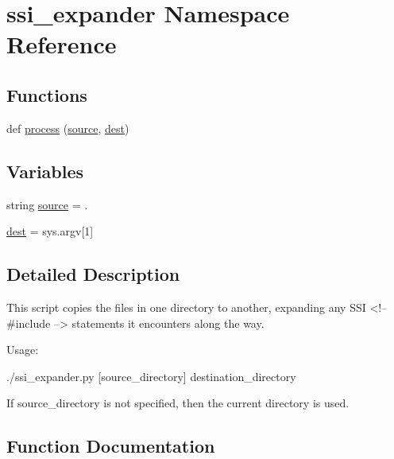 \hypertarget{namespacessi__expander}{}\section{ssi\+\_\+expander Namespace Reference}
\label{namespacessi__expander}
\subsection*{Functions}
\begin{DoxyCompactItemize}
\item 
def \hyperlink{namespacessi__expander_a7e24c8507483ff63310e4e1118ad66bb}{process} (\hyperlink{namespacessi__expander_ae8fa20efba305e039de78680ea6b3fdb}{source}, \hyperlink{namespacessi__expander_ac2e87b5a0738e3d26bda34f001011cc4}{dest})
\end{DoxyCompactItemize}
\subsection*{Variables}
\begin{DoxyCompactItemize}
\item 
string \hyperlink{namespacessi__expander_ae8fa20efba305e039de78680ea6b3fdb}{source} = \textquotesingle{}.\textquotesingle{}
\item 
\hyperlink{namespacessi__expander_ac2e87b5a0738e3d26bda34f001011cc4}{dest} = sys.\+argv\mbox{[}1\mbox{]}
\end{DoxyCompactItemize}


\subsection{Detailed Description}
\begin{DoxyVerb}This script copies the files in one directory to another, expanding any SSI
<!-- #include --> statements it encounters along the way.

Usage:

  ./ssi_expander.py [source_directory] destination_directory

If source_directory is not specified, then the current directory is used.
\end{DoxyVerb}
 

\subsection{Function Documentation}
\mbox{\label{namespacessi__expander_a7e24c8507483ff63310e4e1118ad66bb}} 
